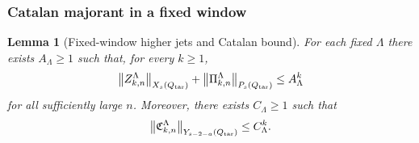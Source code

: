 \documentclass[11pt]{article}
\numberwithin{equation}{section}
\theoremstyle{plain}
\newtheorem{lemma}{Lemma}[section]
\theoremstyle{definition}
\theoremstyle{remark}
\newcommand{\norm}[2]{\left\|#1\right\|_{#2}}
\newcommand{\calC}{\mathfrak C}
\begin{document}
\subsubsection{Catalan majorant in a fixed window}

\begin{lemma}[Fixed-window higher jets and Catalan bound]\label{pIV:lem:fixed-window-bounds}
For each fixed \(\Lambda\) there exists \(A_\Lambda\ge1\) such that, for every
\(k\ge1\),
\begin{equation}\label{pIV:eq:fixed-window-bound}
        \norm{Z_{k,n}^\Lambda}{X_s(Q_{\rm tar})}
        +\norm{\Pi_{k,n}^\Lambda}{P_s(Q_{\rm tar})}
        \le A_\Lambda^k
\end{equation}
for all sufficiently large \(n\).  Moreover, there exists \(C_\Lambda\ge1\) such that
\begin{equation}\label{pIV:eq:compat-coeff-bound}
        \norm{\calC_{k,n}^\Lambda}{Y_{s-2-a}(Q_{\rm tar})}
        \le C_\Lambda^k .
\end{equation}
\end{lemma}
\end{document}
